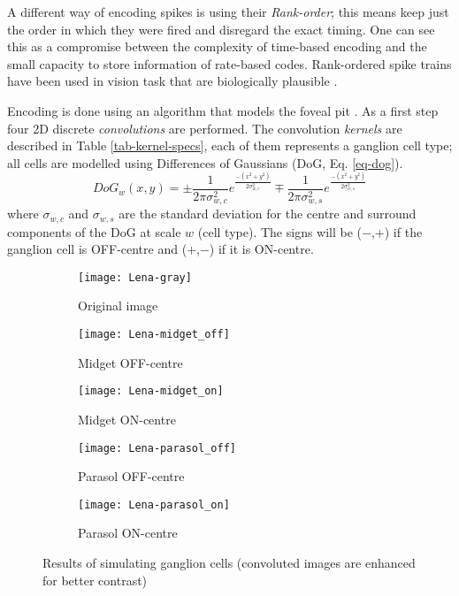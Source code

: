 A different way of encoding spikes is using their \emph{Rank-order}; this means
keep just the order in which they were fired and disregard the exact timing. One
can see this as a compromise between the complexity of time-based encoding and 
the small capacity to store information of rate-based codes. Rank-ordered spike 
trains have been used in vision task that are biologically plausible
\cite{basab-model,van-rullen-rate-coding}.

Encoding is done using an algorithm that models the foveal pit 
\cite{basab-model}. As a first step four 2D discrete \emph{convolutions} are 
performed. The convolution \emph{kernels} are described in Table 
\ref{tab-kernel-specs}, each of them represents a ganglion cell type; 
all cells are modelled using Differences of Gaussians (DoG, Eq. 
\ref{eq-dog}).
\begin{equation}
\label{eq-dog}
DoG_w(x,y) = \pm\frac{1}{2\pi\sigma_{w,c}^2}e^{\frac{-(x^2 + y^2)}{2\sigma_{w,c}^2}}
\mp\frac{1}{2\pi\sigma_{w,s}^2}e^{\frac{-(x^2 + y^2)}{2\sigma_{w,s}^2}}
\end{equation}
where $\sigma_{w,c}$ and $\sigma_{w,s}$ are the standard deviation for the 
centre and surround components of the DoG at scale $w$ (cell type). The signs 
will be ($-$,$+$) if the ganglion cell is OFF-centre and ($+$,$-$) if it is 
ON-centre.
\begin{figure}[hbt]
  \centering
  \begin{subfigure}[t]{0.15\textwidth}
    \centering
    \captionsetup{justification=centering,margin=0.1cm}
    \texttt{[image: Lena-gray]}
    \caption{Original image}
    \label{pic-lena}
  \end{subfigure}
  \begin{subfigure}[t]{0.15\textwidth}
    \centering
    \captionsetup{justification=centering,margin=0.1cm}
    \texttt{[image: Lena-midget\_off]}
    \caption{Midget OFF-centre}
    \label{pic-lena-M-OFF}
  \end{subfigure}
  \begin{subfigure}[t]{0.15\textwidth}
    \centering
    \captionsetup{justification=centering,margin=0.1cm}
    \texttt{[image: Lena-midget\_on]}
    \caption{Midget ON-centre}
    \label{pic-lena-M-ON}
  \end{subfigure}
  \begin{subfigure}[t]{0.15\textwidth}
    \centering
    \captionsetup{justification=centering,margin=0.1cm}
    \texttt{[image: Lena-parasol\_off]}
    \caption{Parasol OFF-centre}
    \label{pic-lena-P-OFF}
  \end{subfigure}
  \begin{subfigure}[t]{0.15\textwidth}
    \centering
    \captionsetup{justification=centering,margin=0.1cm}
    \texttt{[image: Lena-parasol\_on]}
    \caption{Parasol ON-centre}
    \label{pic-lena-P-ON}
  \end{subfigure}
  \caption{Results of simulating ganglion cells (convoluted images are enhanced for better contrast)}
  \label{fig-convolution-results}
\end{figure}
